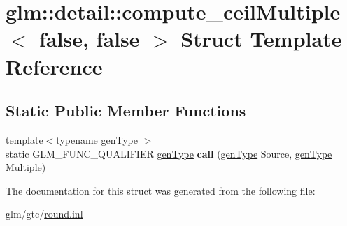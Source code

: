 \hypertarget{structglm_1_1detail_1_1compute__ceilMultiple_3_01false_00_01false_01_4}{\section{glm\-:\-:detail\-:\-:compute\-\_\-ceil\-Multiple$<$ false, false $>$ Struct Template Reference}
\label{structglm_1_1detail_1_1compute__ceilMultiple_3_01false_00_01false_01_4}
}
\subsection*{Static Public Member Functions}
\begin{DoxyCompactItemize}
\item 
\hypertarget{structglm_1_1detail_1_1compute__ceilMultiple_3_01false_00_01false_01_4_a42251f23ffbe25b624948a1128aa9957}{{\footnotesize template$<$typename gen\-Type $>$ }\\static G\-L\-M\-\_\-\-F\-U\-N\-C\-\_\-\-Q\-U\-A\-L\-I\-F\-I\-E\-R \hyperlink{structglm_1_1detail_1_1genType}{gen\-Type} {\bfseries call} (\hyperlink{structglm_1_1detail_1_1genType}{gen\-Type} Source, \hyperlink{structglm_1_1detail_1_1genType}{gen\-Type} Multiple)}\label{structglm_1_1detail_1_1compute__ceilMultiple_3_01false_00_01false_01_4_a42251f23ffbe25b624948a1128aa9957}

\end{DoxyCompactItemize}


The documentation for this struct was generated from the following file\-:\begin{DoxyCompactItemize}
\item 
glm/gtc/\hyperlink{round_8inl}{round.\-inl}\end{DoxyCompactItemize}
